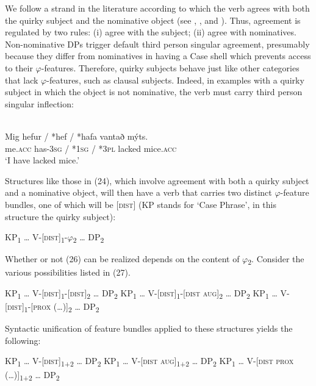 \documentclass[output=paper]{langsci/langscibook}
\begin{document}
We follow a strand in the literature according to which the verb agrees with both the quirky subject and the nominative object (see \citealt{Burzio2000}, \citealt{Schütze2003}, and \citealt{Ussery2013}). Thus,  agreement is regulated by two rules: (i) agree with the subject; (ii) agree with nominatives. Non-nominative DPs trigger default third person singular agreement, presumably because they differ from nominatives in having a Case shell which prevents access to their $\varphi $-features. Therefore, quirky subjects behave just like other categories that lack $\varphi $-features, such as clausal subjects. Indeed, in examples with a quirky subject in which the object is not nominative, the verb must carry third person singular inflection:

\ea \citep{Schütze2003}\\
 \gll    Mig      hefur / *hef / *hafa     vantað mýts. \\
         me.\textsc{acc} has-\textsc{3sg} / *\textsc{1sg} / *\textsc{3pl} lacked mice.\textsc{acc}\\
 \glt    ‘I have lacked mice.’ 
\z

Structures like those in (24), which involve agreement with both a quirky subject and a nominative object, will then have a verb that carries two distinct $\varphi $-feature bundles, one of which will be [\textsc{dist}] (KP stands for ‘Case Phrase’, in this structure the quirky subject):

\ea \label{bkm:Ref295466963}  KP\textsubscript{1} … V-[\textsc{dist}]\textsubscript{1}{}-$\varphi $\textsubscript{2} … DP\textsubscript{2} \z

Whether or not (26) can be realized depends on the content of $\varphi $\textsubscript{2}. Consider the various possibilities listed in (27).

\ea \label{bkm:Ref295570245}\label{bkm:Ref295481259}  
\ea  KP\textsubscript{1} … V-[\textsc{dist}]\textsubscript{1}{}-[\textsc{dist}]\textsubscript{2} … DP\textsubscript{2}
\ex  KP\textsubscript{1} … V-[\textsc{dist}]\textsubscript{1}{}-[\textsc{dist} \textsc{aug}]\textsubscript{2} … DP\textsubscript{2}
\ex  KP\textsubscript{1} … V-[\textsc{dist}]\textsubscript{1}{}-[\textsc{prox} (…)]\textsubscript{2} … DP\textsubscript{2}
\z
\z

Syntactic unification of feature bundles applied to these structures yields the following:

\ea \label{bkm:Ref295480997}  
\ea KP\textsubscript{1} … V-[\textsc{dist}]\textsubscript{1+2} … DP\textsubscript{2}
\ex KP\textsubscript{1} … V-[\textsc{dist} \textsc{aug}]\textsubscript{1+2} … DP\textsubscript{2}
\ex KP\textsubscript{1} … V-[\textsc{dist prox} (…)]\textsubscript{1+2} … DP\textsubscript{2}
\z
\z
\end{document}
